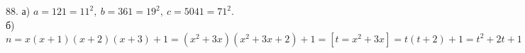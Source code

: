 88. а) $a=121=11^2,\ b=361=19^2,\ c=5041=71^2.$\\
б) $n=x(x+1)(x+2)(x+3)+1=(x^2+3x)(x^2+3x+2)+1=[t=x^2+3x]=t(t+2)+1=t^2+2t+1=(t+1)^2.$\\
